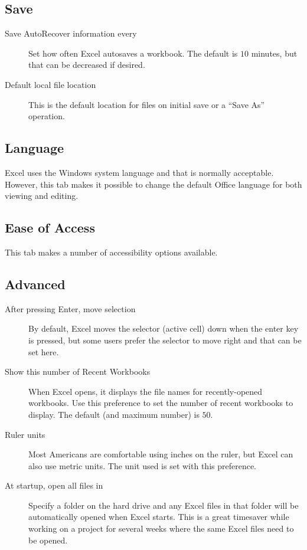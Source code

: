 \subsection{Save}

\begin{description}
	\item[Save AutoRecover information every] Set how often Excel autosaves a workbook. The default is $ 10 $ minutes, but that can be decreased if desired.
	\item[Default local file location] This is the default location for files on initial save or a ``Save As'' operation.
\end{description}

\subsection{Language}

Excel uses the Windows system language and that is normally acceptable. However, this tab makes it possible to change the default Office language for both viewing and editing.

\subsection{Ease of Access}

This tab makes a number of accessibility options available. 

\subsection{Advanced}
	
	\begin{description}
		\item[After pressing Enter, move selection] By default, Excel moves the selector (active cell) down when the enter key is pressed, but some users prefer the selector to move right and that can be set here.
		\item[Show this number of Recent Workbooks] When Excel opens, it displays the file names for recently-opened workbooks. Use this preference to set the number of recent workbooks to display. The default (and maximum number) is $ 50 $.
		\item[Ruler units] Most Americans are comfortable using inches on the ruler, but Excel can also use metric units. The unit used is set with this preference.
		\item[At startup, open all files in] Specify a folder on the hard drive and any Excel files in that folder will be automatically opened when Excel starts. This is a great timesaver while working on a project for several weeks where the same Excel files need to be opened.
	\end{description}
	
